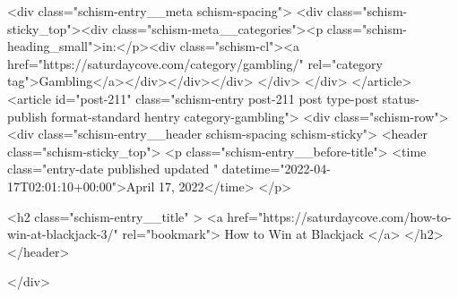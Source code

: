 {		<div class="schism-entry__meta schism-spacing">			<div class="schism-sticky_top"><div class="schism-meta__categories"><p class="schism-heading_small">in:</p><div class="schism-cl"><a href="https://saturdaycove.com/category/gambling/" rel="category tag">Gambling</a></div></div></div>		</div>
	</div>
</article>
<article id="post-211" class="schism-entry post-211 post type-post status-publish format-standard hentry category-gambling">
	<div class="schism-row">		<div class="schism-entry__header schism-spacing schism-sticky">			<header class="schism-sticky_top">				<p class="schism-entry__before-title">
					<time class="entry-date published updated " datetime="2022-04-17T02:01:10+00:00">April 17, 2022</time>				</p>

				<h2 class="schism-entry__title" >
					<a href="https://saturdaycove.com/how-to-win-at-blackjack-3/" rel="bookmark">
						How to Win at Blackjack					</a>
				</h2>
			</header>

					</div>

}
